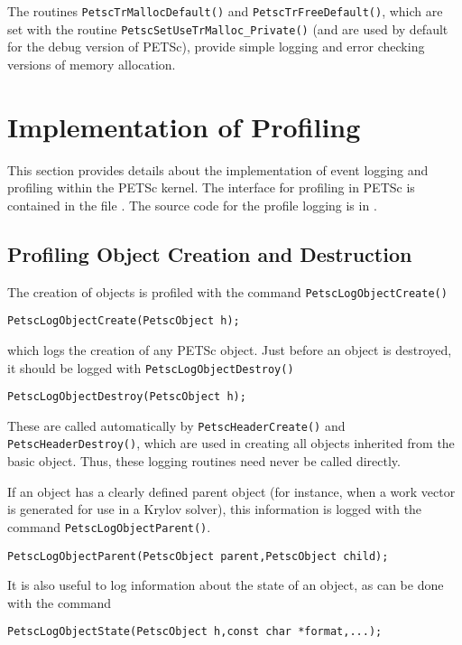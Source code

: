The routines \lstinline{PetscTrMallocDefault()} and \lstinline{PetscTrFreeDefault()}, which are set with the routine \lstinline{PetscSetUseTrMalloc_Private()} (and are used by default for the debug version of PETSc), provide simple logging and error checking versions of memory allocation.



\section{Implementation of Profiling}
\label{sec:profimpl}

This section provides details about the implementation of event
logging and profiling within the PETSc kernel.
The interface for profiling in PETSc is contained in the file
\href{https://www.mcs.anl.gov/petsc/petsc-master/include/petsclog.h.html}{}. The source code for the profile logging
is in .

\subsection{Profiling Object Creation and Destruction}

The creation of objects is profiled with the command
 \lstinline{PetscLogObjectCreate()}
\begin{lstlisting}
PetscLogObjectCreate(PetscObject h);
\end{lstlisting}
which logs the creation of any PETSc object.
Just before an object is destroyed, it should be  logged with
\lstinline{PetscLogObjectDestroy()}
\begin{lstlisting}
PetscLogObjectDestroy(PetscObject h);
\end{lstlisting}
These are called automatically by \lstinline{PetscHeaderCreate()} and
\lstinline{PetscHeaderDestroy()}, which are used in creating all objects
inherited from the basic object. Thus, these logging routines need
never be called directly.

If an object has a clearly defined parent object (for instance, when
a work vector is generated for use in a Krylov solver), this information
is logged with the command \lstinline{PetscLogObjectParent()}.
\begin{lstlisting}
PetscLogObjectParent(PetscObject parent,PetscObject child);
\end{lstlisting}
It is also useful to log information about the state of an object, as can
be done with the command
\begin{lstlisting}
PetscLogObjectState(PetscObject h,const char *format,...);
\end{lstlisting}

